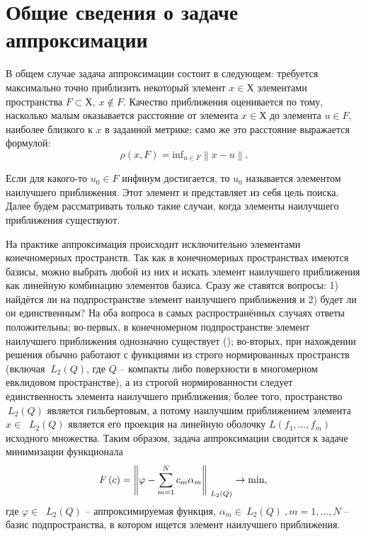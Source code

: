 ﻿\documentclass[a4paper, 12pt]{article}
\begin{document}
\section{Общие сведения о задаче аппроксимации}

В общем случае задача аппроксимации состоит в следующем: требуется максимально точно приблизить некоторый элемент $x\in \textrm{Х}$  элементами пространства $F\subset \textrm{Х},\ x\notin F$.
Качество приближения оценивается по тому, насколько малым оказывается расстояние от элемента $x\in \textrm{Х}$ до элемента $u\in F$, наиболее близкого к $x$ в заданной метрике; само же это расстояние выражается формулой:
\begin{equation} \rho \left(x,F\right)={\mathrm{inf}}_{u\in F}\left\|x-u\right\|.\end{equation} 

Если для какого-то $u_0\in F$ инфинум достигается, то $u_0$ называется элементом наилучшего приближения. Этот элемент и представляет из себя цель поиска. Далее будем рассматривать только такие случаи, когда элементы наилучшего приближения существуют.

На практике аппроксимация происходит исключительно элементами конечномерных пространств.
Так как в конечномерных пространствах имеются базисы, можно выбрать любой из них и искать элемент наилучшего приближения как линейную комбинацию элементов базиса.
Сразу же ставятся вопросы: 1) найдётся ли на подпространстве элемент наилучшего приближения и 2) будет ли он единственным?
На оба вопроса в самых распространённых случаях ответы положительны; во-первых, в конечномерном подпространстве элемент наилучшего приближения однозначно существует (\cite{9korn, 10ax}); во-вторых, при нахождении решения обычно работают с функциями из строго нормированных пространств (включая ${\ L}_2\left(Q\right)$, где $Q$ -- компакты либо поверхности в многомерном евклидовом пространстве), а из строгой нормированности следует единственность элемента наилучшего приближения; более того, пространство ${\ L}_2\left(Q\right)$ является гильбертовым, а потому наилучшим приближением элемента $x\in $ ${\ L}_2\left(Q\right)$ является его проекция на линейную оболочку $L\left(f_1,\dots ,f_m\right)$ исходного множества. Таким образом, задача аппроксимации сводится к задаче минимизации функционала
\begin{equation}F\left(c\right)={\left\|\varphi -\sum^N_{m=1}{c_m}{\alpha }_m\right\|}_{{\ L}_2\left(Q\right)}\to \mathrm{min},\\\end{equation} 
где $\varphi \in $ ${\ L}_2\left(Q\right)$ -- аппроксимируемая функция, ${\alpha }_m\in {\ L}_2\left(Q\right)\mathrm{\ },m=1,\dots ,N$ -- базис подпространства, в котором ищется элемент наилучшего приближения.
\end{document}
